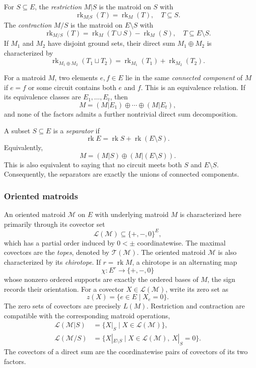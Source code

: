 \documentclass[10pt]{amsart}
\theoremstyle{plain}
\theoremstyle{definition}
\newcommand{\T}{\mathcal{T}}
\newcommand{\M}{\mathcal{M}}
\newcommand{\Lcov}{\mathcal{L}}
\newcommand{\rk}{\operatorname{rk}}
\begin{document}
For $S\subseteq E$, the \emph{restriction} $M|S$ is the matroid on $S$ with
\[
\rk_{M|S}(T)=\rk_M(T),\quad T\subseteq S.
\]
The \emph{contraction} $M/S$ is the matroid on $E\setminus S$ with
\[
\rk_{M/S}(T)=\rk_M(T\cup S)-\rk_M(S),\quad T\subseteq E\setminus S.
\]
If $M_1$ and $M_2$ have disjoint ground sets, their direct sum $M_1\oplus M_2$ is characterized by
\[
\rk_{M_1\oplus M_2}(T_1\sqcup T_2)=\rk_{M_1}(T_1)+\rk_{M_2}(T_2).
\]

For a matroid $M$, two elements $e,f\in E$ lie in the same \emph{connected component} of $M$ if $e=f$ or some circuit contains both $e$ and $f$. This is an equivalence relation. If its equivalence classes are $E_1,\ldots,E_t$, then
\[
M=(M|E_1)\oplus\cdots\oplus(M|E_t),
\]
and none of the factors admits a further nontrivial direct sum decomposition.

A subset $S\subseteq E$ is a \emph{separator} if
\[
\rk E=\rk S+\rk(E\setminus S).
\]
Equivalently,
\[
M=(M|S)\oplus(M|(E\setminus S)).
\]
This is also equivalent to saying that no circuit meets both $S$ and $E\setminus S$. Consequently, the separators are exactly the unions of connected components.

\subsubsection{Oriented matroids}
An oriented matroid $\M$ on $E$ with underlying matroid $M$ is characterized here primarily through its covector set
\[
\Lcov(\M)\subseteq\{+,-,0\}^E,
\]
which has a partial order induced by $0<\pm$ coordinatewise. The maximal covectors are the \emph{topes}, denoted by $\T(\M)$. The oriented matroid $\M$ is also characterized by its \emph{chirotope}. If $r=\rk M$, a chirotope is an alternating map
\[
\chi:E^r\to\{+,-,0\}
\]
whose nonzero ordered supports are exactly the ordered bases of $M$, the sign records their orientation. For a covector $X\in\Lcov(\M)$, write its zero set as
\[
z(X)=\{e\in E \mid X_e=0\}.
\]
The zero sets of covectors are precisely $L(M)$. Restriction and contraction are compatible with the corresponding matroid operations,
\begin{align*}
\Lcov(\M|S)&=\{X|_S \mid X\in\Lcov(\M)\},\\
\Lcov(\M/S)&=\{X|_{E\setminus S} \mid X\in\Lcov(\M),\ X|_S=0\}.
\end{align*}
The covectors of a direct sum are the coordinatewise pairs of covectors of its two factors.
\end{document}
